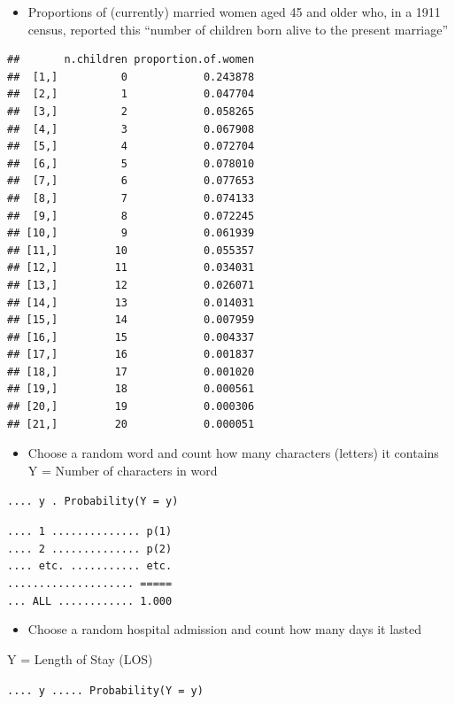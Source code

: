 \documentclass[]{book}
\providecommand{\tightlist}{%
  \setlength{\itemsep}{0pt}\setlength{\parskip}{0pt}}
\begin{document}
\begin{itemize}
\tightlist
\item
  Proportions of (currently) married women aged 45 and older who, in a 1911 census, reported this ``number of children born alive to the present marriage''
\end{itemize}

\begin{verbatim}
##       n.children proportion.of.women
##  [1,]          0            0.243878
##  [2,]          1            0.047704
##  [3,]          2            0.058265
##  [4,]          3            0.067908
##  [5,]          4            0.072704
##  [6,]          5            0.078010
##  [7,]          6            0.077653
##  [8,]          7            0.074133
##  [9,]          8            0.072245
## [10,]          9            0.061939
## [11,]         10            0.055357
## [12,]         11            0.034031
## [13,]         12            0.026071
## [14,]         13            0.014031
## [15,]         14            0.007959
## [16,]         15            0.004337
## [17,]         16            0.001837
## [18,]         17            0.001020
## [19,]         18            0.000561
## [20,]         19            0.000306
## [21,]         20            0.000051
\end{verbatim}

\begin{itemize}
\tightlist
\item
  Choose a random word and count how many characters (letters) it contains\\
  Y = Number of characters in word
\end{itemize}

\texttt{....\ y\ .\ Probability(Y\ =\ y)}

\texttt{....\ 1\ ..............\ p(1)}\\
\texttt{....\ 2\ ..............\ p(2)}~\\
\texttt{....\ etc.\ ...........\ etc.}~\\
\texttt{....................\ =====}~\\
\texttt{...\ ALL\ ............\ 1.000}

\begin{itemize}
\tightlist
\item
  Choose a random hospital admission and count how many days it lasted
\end{itemize}

Y = Length of Stay (LOS)

\texttt{....\ y\ .....\ Probability(Y\ =\ y)}
\end{document}
